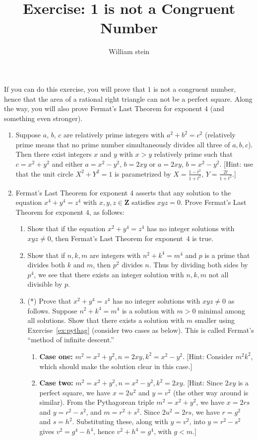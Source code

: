 \documentclass[11pt]{article}
\title{Exercise: 1 is not a Congruent Number}
\author{William stein}
\newcommand{\Z}{\mathbf{Z}}
\begin{document}
\vspace{-5em}

\maketitle

If you can do this exercise, you will prove that $1$ is not a
congruent number, hence that the area of a rational right triangle can
not be a perfect square.  Along the way, you will also prove Fermat's
Last Theorem for exponent $4$ (and something even stronger).


\begin{enumerate}
\item\label{ex:pythag} Suppose $a$, $b$, $c$ are relatively prime
  integers with $a^2+b^2=c^2$ (relatively prime means that no prime
  number simultaneously divides all three of $a,b,c$).  Then there
  exist integers $x$ and $y$ with $x>y$ relatively prime such that
  $c=x^2+y^2$ and either $a=x^2-y^2$, $b=2xy$ or $a=2xy$, $b=x^2-y^2$.
  [Hint: use that the unit circle $X^2+Y^2=1$ is parametrized by
  $X=\frac{1-t^2}{1+t^2}$, $Y=\frac{2t}{1+t^2}$.]

\item \label{ex:flt4} Fermat's Last Theorem for exponent $4$ asserts
  that any solution to the equation $x^4+y^4=z^4$ with $x,y,z\in\Z$
  satisfies $xyz=0$.  Prove Fermat's Last
  Theorem for exponent $4$, as follows:
\begin{enumerate}
\item Show that if the equation $x^2+y^4=z^4$ has no integer solutions
  with $xyz\neq 0$, then Fermat's Last Theorem for exponent~$4$ is
  true.
\item Show that if $n,k,m$ are integers with $n^2+k^4=m^4$ and $p$ is
  a prime that divides both $k$ and $m$, then $p^2$ divides $n$.  Thus
  by dividing both sides by $p^4$, we see that there exists an integer
  solution with $n,k,m$ not all divisible by $p$.
\item(*) Prove that $x^2+y^4=z^4$ has no integer solutions with $xyz\neq
  0$ as follows.  Suppose $n^2+k^4=m^4$ is a solution with $m>0$
  minimal among all solutions.  Show that there exists a solution with
  $m$ smaller using Exercise~\ref{ex:pythag} (consider two cases as below).
This is called Fermat's ``method of infinite descent.''
\begin{enumerate}
\item {\bf Case one:} $m^2=x^2+y^2, n=2xy, k^2=x^2-y^2$.  [Hint:
  Consider $m^2k^2$, which should make the solution clear in this
  case.]
\item {\bf Case two:} $m^2=x^2+y^2, n=x^2-y^2, k^2=2xy$.  
[Hint: Since $2xy$ is a perfect square, we have $x=2u^2$ and $y=v^2$ (the
other way around is similar).
From the Pythagorean triple $m^2=x^2+y^2$, we have
$x=2rs$ and $y=r^2-s^2$, and $m=r^2+s^2$.
Since $2u^2=2rs$, we have $r=g^2$ and $s=h^2$.
Substituting these, along with $y=v^2$, into
$y=r^2-s^2$ gives $v^2=g^4-h^4$, hence $v^2+h^4=g^4$, with $g<m$.]
\end{enumerate}
\end{enumerate}


\end{enumerate}
\end{document}
